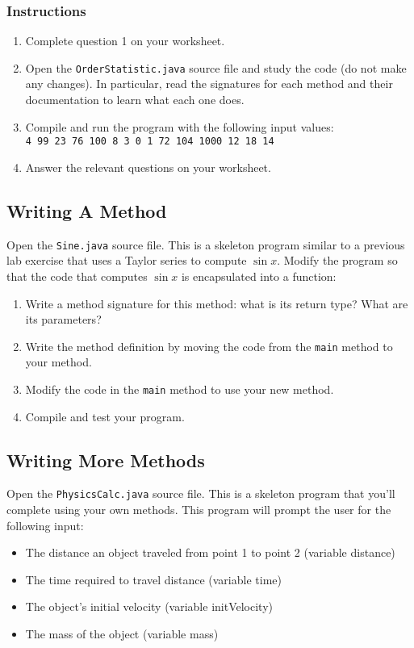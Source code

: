 \documentclass[12pt]{scrartcl}
\begin{document}
\subsubsection*{Instructions}

\begin{enumerate}
  \item Complete question 1 on your worksheet.
  \item Open the \texttt{OrderStatistic.java} source file and
	study the code (do not make any changes).  In particular, read
	the signatures for each method and their documentation to
	learn what each one does.  
  \item Compile and run the program with the following input values: \\
	\texttt{4 99 23 76 100 8 3 0 1 72 104 1000 12 18 14}
  \item Answer the relevant questions on your worksheet.
\end{enumerate}

\subsection{Writing A Method}

Open the \texttt{Sine.java} source file.  This is a skeleton 
program similar to a previous lab exercise that uses a Taylor series
to compute $\sin{x}$.  Modify the program so that the code that
computes $\sin{x}$ is encapsulated into a function:

\begin{enumerate}
  \item Write a method signature for this method: what is its return
  	type?  What are its parameters?  
  \item Write the method definition by moving the code from the \texttt{main}
  	method to your method.
  \item Modify the code in the \texttt{main} method to use your new
  	method.
  \item Compile and test your program.
\end{enumerate}

\subsection{Writing More Methods}

Open the \texttt{PhysicsCalc.java} source file.  This is a skeleton 
program that you'll complete using your own methods.  This program 
will prompt the user for the following input:
\begin{itemize}
  \item The distance an object traveled from point 1 to point 2 (variable distance)
  \item The time required to travel distance (variable time)
  \item The object's initial velocity (variable initVelocity)
  \item The mass of the object (variable mass)
\end{itemize}
\end{document}
